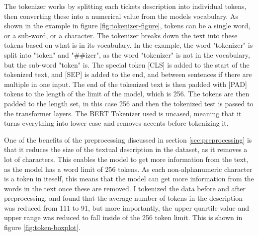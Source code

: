 \documentclass{UoYCSproject}
\begin{document}
    The tokenizer works by splitting each tickets description into individual tokens, then converting these into a numerical value from the models vocabulary.
    As shown in the example in figure \ref{fig:tokenizer-figure}, tokens can be a single word, or a sub-word, or a character. The tokenizer breaks down the text into these tokens based on what is in its vocabulary.
    In the example, the word "tokenizer" is split into "token" and "\#\#izer", as the word "tokenizer" is not in the vocabulary, but the sub-word "token" is.
    The special token [CLS] is added to the start of the tokenized text, and [SEP] is added to the end, and between sentences if there are multiple in one input.
    The end of the tokenized text is then padded with [PAD] tokens to the length of the limit of the model, which is 256.
    The tokens are then padded to the length set, in this case 256 and then the tokenized test is passed to the transformer layers.
    The BERT Tokenizer used is uncased, meaning that it turns everything into lower case and removes accents before tokenizing it.
    \par

    One of the benefits of the preprocessing discussed in section \ref{sec:preprocessing} is that it reduces the size of the textual description in the dataset, as it removes a lot of characters.
    This enables the model to get more information from the text, as the model has a word limit of 256 tokens. As each non-alphanumeric character is a token in iteself, this means that the model can get more information from the words in the text once these are removed.
    I tokenized the data before and after preprocessing, and found that the average number of tokens in the description was reduced from 111 to 91, but more importantly, the upper quartile value and upper range was reduced to fall inside of the 256 token limit.
    This is shown in figure \ref{fig:token-boxplot}.
\end{document}

